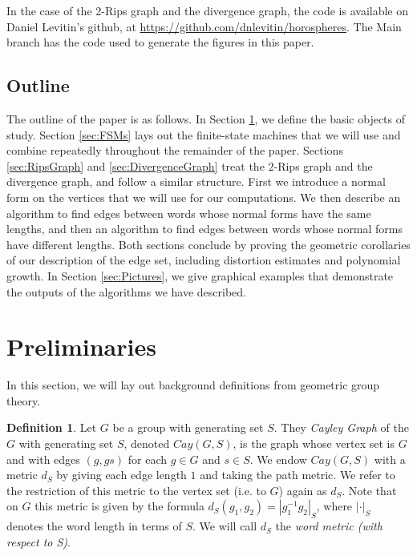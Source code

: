 \documentclass{amsart}
\theoremstyle{definition}
\newtheorem{definition}[theorem]{Definition}
\theoremstyle{remark}
\begin{document}
	In the case of the 2-Rips graph and the divergence graph, the code is available on Daniel Levitin's github, at \url{https://github.com/dnlevitin/horospheres}. The Main branch has the code used to generate the figures in this paper.
	
    \subsection*{Outline}

    The outline of the paper is as follows. In Section \ref{sec:preliminaries}, we define the basic objects of study. Section \ref{sec:FSMs} lays out the finite-state machines that we will use and combine repeatedly throughout the remainder of the paper. Sections \ref{sec:RipsGraph} and \ref{sec:DivergenceGraph} treat the $2$-Rips graph and the divergence graph, and follow a similar structure. First we introduce a normal form on the vertices that we will use for our computations. We then describe an algorithm to find edges between words whose normal forms have the same lengths, and then an algorithm to find edges between words whose normal forms have different lengths. Both sections conclude by proving the geometric corollaries of our description of the edge set, including distortion estimates and polynomial growth. In Section \ref{sec:Pictures}, we give graphical examples that demonstrate the outputs of the algorithms we have described.
	
	\section{Preliminaries}
	\label{sec:preliminaries}

	In this section, we will lay out background definitions from geometric group theory.
	
	\begin{definition}
		
		Let $G$ be a group with generating set $S$. They \textit{Cayley Graph} of the $G$ with generating set $S$, denoted $Cay(G,S)$, is the graph whose vertex set is $G$ and with edges $(g,gs)$ for each $g\in G$ and $s\in S$. We endow $Cay(G,S)$ with a metric $d_S$ by giving each edge length $1$ and taking the path metric. We refer to the restriction of this metric to the vertex set (i.e. to $G$) again as $d_S$. Note that on $G$ this metric is given by the formula $d_S(g_1,g_2)=|g_1^{-1}g_2|_S$, where $|\cdot|_S$ denotes the word length in terms of $S$. We will call $d_S$ the \textit{word metric (with respect to S)}.
		
	\end{definition}
	
\end{document}
